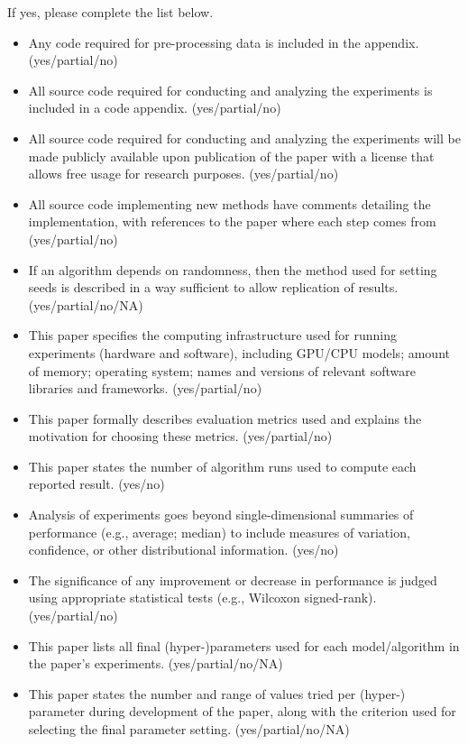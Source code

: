 \noindent If yes, please complete the list below.
\begin{itemize}
\item Any code required for pre-processing data is included in the appendix. (yes/partial/no) 
\item All source code required for conducting and analyzing the experiments is included in a code appendix. (yes/partial/no) 
\item All source code required for conducting and analyzing the experiments will be made publicly available upon publication of the paper with a license that allows free usage for research purposes. (yes/partial/no) 
\item All source code implementing new methods have comments detailing the implementation, with references to the paper where each step comes from (yes/partial/no) 
\item If an algorithm depends on randomness, then the method used for setting seeds is described in a way sufficient to allow replication of results. (yes/partial/no/NA) 
\item This paper specifies the computing infrastructure used for running experiments (hardware and software), including GPU/CPU models; amount of memory; operating system; names and versions of relevant software libraries and frameworks. (yes/partial/no) 
\item This paper formally describes evaluation metrics used and explains the motivation for choosing these metrics. (yes/partial/no) 
\item This paper states the number of algorithm runs used to compute each reported result. (yes/no) 
\item Analysis of experiments goes beyond single-dimensional summaries of performance (e.g., average; median) to include measures of variation, confidence, or other distributional information. (yes/no) 
\item The significance of any improvement or decrease in performance is judged using appropriate statistical tests (e.g., Wilcoxon signed-rank). (yes/partial/no) 
\item This paper lists all final (hyper-)parameters used for each model/algorithm in the paper’s experiments. (yes/partial/no/NA) 
\item This paper states the number and range of values tried per (hyper-) parameter during development of the paper, along with the criterion used for selecting the final parameter setting. (yes/partial/no/NA) 
\end{itemize}